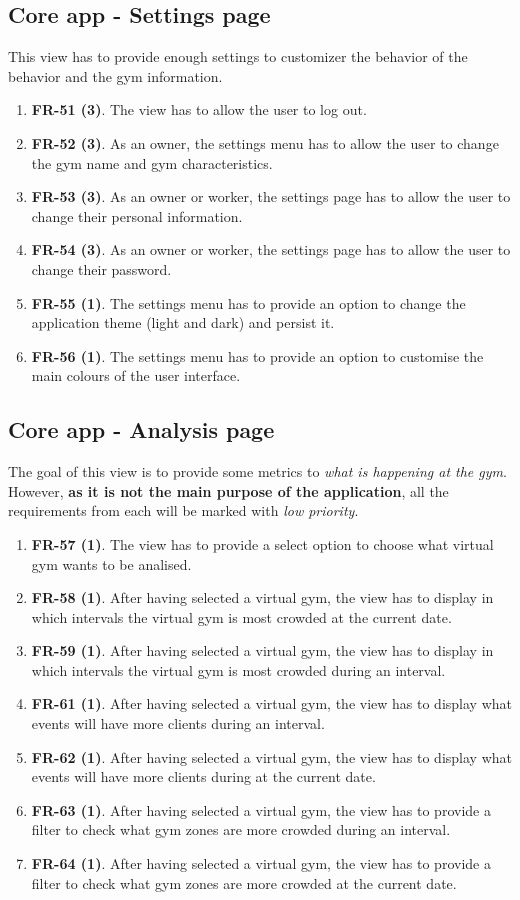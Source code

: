 \documentclass[a4paper, 12pt, oneside]{book}
\begin{document}
\subsection{Core app - Settings page}
This view has to provide enough settings to customizer the behavior of the behavior and the gym information.
\begin{enumerate}[label = -]
	\item \textbf{FR-51 (3)}. The view has to allow the user to log out.
	\item \textbf{FR-52 (3)}. As an owner, the settings menu has to allow the user to change the gym name and gym characteristics.
	\item \textbf{FR-53 (3)}. As an owner or worker, the settings page has to allow the user to change their personal information.
	\item \textbf{FR-54 (3)}. As an owner or worker, the settings page has to allow the user to change their password.
	\item \textbf{FR-55 (1)}. The settings menu has to provide an option to change the application theme (light and dark) and persist it.
	\item \textbf{FR-56 (1)}. The settings menu has to provide an option to customise the main colours of the user interface.
\end{enumerate}
\subsection{Core app - Analysis page}
The goal of this view is to provide some metrics to \emph{what is happening at the gym}. However, \textbf{as it is not the main purpose of the application}, all the requirements from each will be marked with \emph{low priority}.
\begin{enumerate}[label = -]
	\item \textbf{FR-57 (1)}. The view has to provide a select option to choose what virtual gym wants to be analised.
	\item \textbf{FR-58 (1)}. After having selected a virtual gym, the view has to display in which intervals the virtual gym is most crowded at the current date.
	\item \textbf{FR-59 (1)}. After having selected a virtual gym, the view has to display in which intervals the virtual gym is most crowded during an interval.
	\item \textbf{FR-61 (1)}. After having selected a virtual gym, the view has to display what events will have more clients during an interval.
	\item \textbf{FR-62 (1)}. After having selected a virtual gym, the view has to display what events will have more clients during at the current date.
	\item \textbf{FR-63 (1)}. After having selected a virtual gym, the view has to provide a filter to check what gym zones are more crowded during an interval.
	\item \textbf{FR-64 (1)}. After having selected a virtual gym, the view has to provide a filter to check what gym zones are more crowded at the current date.
\end{enumerate}
\end{document}
